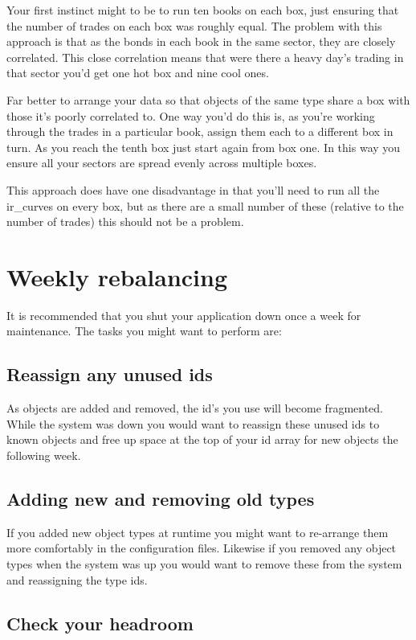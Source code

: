 \documentclass{report}
\begin{document}
Your first instinct might to be to run ten books on each box, just ensuring that the number of trades on each box was roughly equal. The problem with this approach is that as the bonds in each book in the same sector, they are closely correlated. This close correlation means that were there a heavy day's trading in that sector you'd get one hot box and nine cool ones.

Far better to arrange your data so that objects of the same type share a box with those it's poorly correlated to. One way you'd do this is, as you're working through the trades in a particular book, assign them each to a different box in turn. As you reach the tenth box just start again from box one. In this way you ensure all your sectors are spread evenly across multiple boxes.

This approach does have one disadvantage in that you'll need to run all the ir_curves on every box, but as there are a small number of these (relative to the number of trades) this should not be a problem.

\section{Weekly rebalancing}

It is recommended that you shut your application down once a week for maintenance. The tasks you might want to perform are:

\subsection{Reassign any unused ids}

As objects are added and removed, the id's you use will become fragmented. While the system was down you would want to reassign these unused ids to known objects and free up space at the top of your id array for new objects the following week.

\subsection{Adding new and removing old types}

If you added new object types at runtime you might want to re-arrange them more comfortably in the configuration files. Likewise if you removed any object types when the system was up you would want to remove these from the system and reassigning the type ids.

\subsection{Check your headroom}
\end{document}
